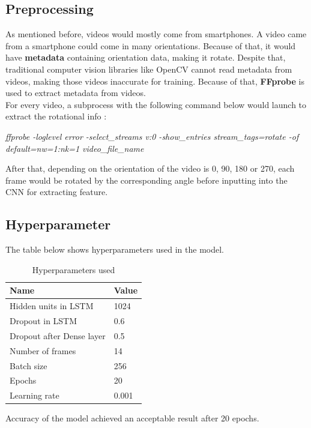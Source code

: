 \subsection{Preprocessing}
As mentioned before, videos would mostly come from smartphones. A video came from a smartphone could come in many orientations. Because of that, it would have \textbf{metadata} containing orientation data, making it rotate. Despite that, traditional computer vision libraries like OpenCV cannot read metadata from videos, making those videos inaccurate for training. Because of that, \textbf{FFprobe} is used to extract metadata from videos.\\
For every video, a subprocess with the following command below would launch to extract the rotational info :\\
\begin{center}
\textit{ffprobe -loglevel error -select\_streams v:0 -show\_entries stream\_tags=rotate -of  default=nw=1:nk=1 video\_file\_name}
\end{center}
After that, depending on the orientation of the video is 0, 90, 180 or 270, each frame would be rotated by the corresponding angle before inputting into the CNN for extracting feature. 
\subsection{Hyperparameter}
The table below shows hyperparameters used in the model.
\begin{table}[H]
	\begin{tabular}{|P{5cm}|L{5cm}|}
		\hline
		\textbf{Name}				&  \textbf{Value}
		\\ \hline
		Hidden units in LSTM		&   1024
		\\ \hline
		Dropout	in LSTM				&  	0.6      
		\\ \hline
		Dropout after Dense layer	&	0.5
		\\ \hline
		Number of frames			&   14
		\\ \hline
		Batch size					&   256
		\\ \hline
		Epochs						&   20
		\\ \hline
		Learning rate				&   0.001
		\\ \hline
	\end{tabular}
\caption{Hyperparameters used}
Accuracy of the model achieved an acceptable result after 20 epochs.
\end{table}
